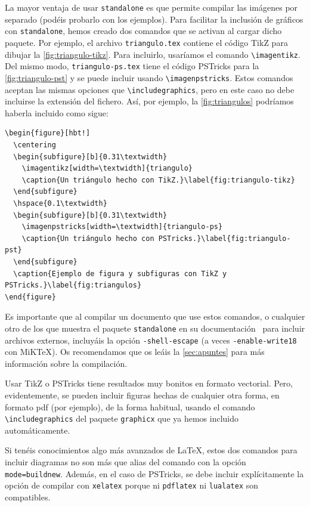 \documentclass{TEMat-article}
\begin{document}
La mayor ventaja de usar \verb+standalone+ es que permite compilar las imágenes por separado (podéis probarlo con los ejemplos).
Para facilitar la inclusión de gráficos con \verb+standalone+, hemos creado dos comandos que se activan al cargar dicho paquete.
Por ejemplo, el archivo \verb+triangulo.tex+ contiene el código TikZ para dibujar la \cref{fig:triangulo-tikz}.
Para incluirlo, usaríamos el comando \verb+\imagentikz+.
Del mismo modo, \verb+triangulo-ps.tex+ tiene el código PSTricks para la \cref{fig:triangulo-pst} y se puede incluir usando \verb+\imagenpstricks+.
Estos comandos aceptan las mismas opciones que \verb+\includegraphics+, pero en este caso no debe incluirse la extensión del fichero.
Así, por ejemplo, la \cref{fig:triangulos} podríamos haberla incluido como sigue:
\begin{verbatim}
\begin{figure}[hbt!]
  \centering
  \begin{subfigure}[b]{0.31\textwidth}
    \imagentikz[width=\textwidth]{triangulo}
    \caption{Un triángulo hecho con TikZ.}\label{fig:triangulo-tikz}
  \end{subfigure}
  \hspace{0.1\textwidth}
  \begin{subfigure}[b]{0.31\textwidth}
    \imagenpstricks[width=\textwidth]{triangulo-ps}
    \caption{Un triángulo hecho con PSTricks.}\label{fig:triangulo-pst}
  \end{subfigure}
  \caption{Ejemplo de figura y subfiguras con TikZ y PSTricks.}\label{fig:triangulos}
\end{figure}
\end{verbatim}

Es importante que al compilar un documento que use estos comandos, o cualquier otro de los que muestra el paquete \verb+standalone+ en su documentación~\cite{standalone} para incluir archivos externos, incluyáis la opción \verb+-shell-escape+ (a veces \verb+-enable-write18+ con MiK\TeX).
Os recomendamos que os leáis la \cref{sec:apuntes} para más información sobre la compilación.

Usar TikZ o PSTricks tiene resultados muy bonitos en formato vectorial.
Pero, evidentemente, se pueden incluir figuras hechas de cualquier otra forma, en formato pdf (por ejemplo), de la forma habitual, usando el comando \verb+\includegraphics+ del paquete \verb+graphicx+ que ya hemos incluido automáticamente.

\begin{nota}
Si tenéis conocimientos algo más avanzados de \LaTeX{}, estos dos comandos para incluir diagramas no son más que alias del comando \verb++ con la opción \verb+mode=buildnew+.
Además, en el caso de PSTricks, se debe incluir explícitamente la opción de compilar con \verb+xelatex+ porque ni \verb+pdflatex+ ni \verb+lualatex+ son compatibles.
\end{nota}
\end{document}
